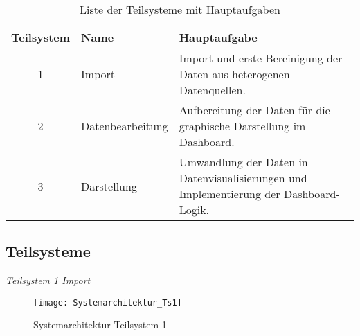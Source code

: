        \begingroup
            \setlength{\tabcolsep}{4pt} %
            \renewcommand{\arraystretch}{1.5}
            \begin{table}[H]
                \centering
                \begin{adjustbox}{max width=\textwidth}
                \LARGE
                \begin{tabular}{cll}
                   \toprule
                   \textbf{Teilsystem}             & Name   &{Hauptaufgabe} \\
                   \midrule     
                            1                      &Import  &Import und erste Bereinigung der Daten aus heterogenen Datenquellen.\\
                            2                      &Datenbearbeitung     &Aufbereitung der Daten für die graphische Darstellung im Dashboard.\\
                            3                      &Darstellung          &Umwandlung der Daten in Datenvisualisierungen und Implementierung der Dashboard-Logik.\\

                    \bottomrule
                \end{tabular}
                \end{adjustbox}
                \caption{%
                    Liste der Teilsysteme mit Hauptaufgaben
                \label{tab:Teilsysteme}
                }
                 \end{table}
            \endgroup

    \subsection{Teilsysteme}
    \label{chap:five_one_three}
    
    \clearpage
    \textit{Teilsystem 1 Import}\\
    \begin{figure}[H]
        \centering
            \texttt{[image: Systemarchitektur\_Ts1]}
            \caption{Systemarchitektur Teilsystem 1}
            \label{fig:Systemarchitektur Teilsystem 1}
    \end{figure}


